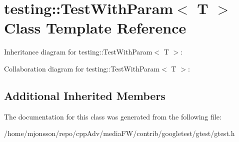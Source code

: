 \hypertarget{classtesting_1_1TestWithParam}{}\section{testing\+:\+:Test\+With\+Param$<$ T $>$ Class Template Reference}
\label{classtesting_1_1TestWithParam}


Inheritance diagram for testing\+:\+:Test\+With\+Param$<$ T $>$\+:


Collaboration diagram for testing\+:\+:Test\+With\+Param$<$ T $>$\+:
\subsection*{Additional Inherited Members}


The documentation for this class was generated from the following file\+:\begin{DoxyCompactItemize}
\item 
/home/mjonsson/repo/cpp\+Adv/media\+F\+W/contrib/googletest/gtest/gtest.\+h\end{DoxyCompactItemize}
